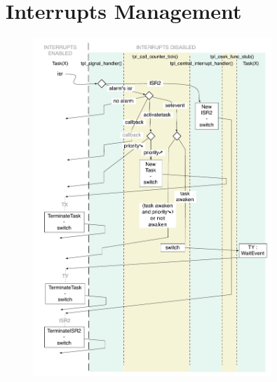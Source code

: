 \documentclass[10pt]{article}
\begin{document}
\section{Interrupts Management} \label{interrupts_management}
	\begin{figure}[htbp] %
   		\centering
		\includegraphics[width=0.8\textwidth]{graphics/Interrupts_Management.pdf}
	\end{figure}
	
 
 
\end{document}
